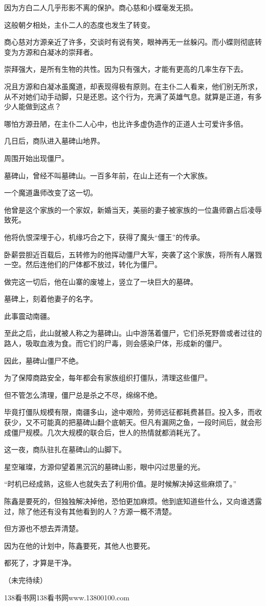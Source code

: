 \begin{this_body}
因为方白二人几乎形影不离的保护。商心慈和小蝶毫发无损。

这般朝夕相处，主仆二人的态度也发生了转变。

商心慈对方源亲近了许多，交谈时有说有笑，眼神再无一丝躲闪。而小蝶则彻底转变为方源和白凝冰的崇拜者。

崇拜强大，是所有生物的共性。因为只有强大，才能有更高的几率生存下去。

况且方源和白凝冰虽魔道，却表现得极有原则。在主仆二人看来，他们别无所求，从不对她们动手动脚，只是还恩。这个行为，充满了英雄气息。就算是正道，有多少人能做到这点？

哪怕方源丑陋，在主仆二人心中，也比许多虚伪造作的正道人士可爱许多倍。

几日后，商队进入墓碑山地界。

周围开始出现僵尸。

墓碑山，曾经不叫墓碑山。一百多年前，在山上还有一个大家族。

一个魔道蛊师改变了这一切。

他曾是这个家族的一个家奴，新婚当天，美丽的妻子被家族的一位蛊师霸占后凌辱致死。

他将仇恨深埋于心，机缘巧合之下，获得了魔头“僵王”的传承。

卧薪尝胆近百载后，五转修为的他挥动僵尸大军，突袭了这个家族，将所有人屠戮一空。然后连他们的尸体都不放过，转化为僵尸。

做完这一切后，他在山寨的废墟上，竖立了一块巨大的墓碑。

墓碑上，刻着他妻子的名字。

此事震动南疆。

至此之后，此山就被人称之为墓碑山。山中游荡着僵尸，它们杀死野兽或者过往的路人，吸取血液为食。而它们的尸毒，则会感染尸体，形成新的僵尸。

因此，墓碑山僵尸不绝。

为了保障商路安全，每年都会有家族组织打僵队，清理这些僵尸。

但不管怎么清理，僵尸总是杀之不尽，绵绵不绝。

毕竟打僵队规模有限，南疆多山，途中艰险，劳师远征都耗费甚巨。投入多，而收获少，又不可能真的把墓碑山翻个底朝天。但凡有漏网之鱼，一段时间后，就会形成僵尸规模。几次大规模的联合后，世人的热情就都消耗光了。

这一夜，商队驻扎在墓碑山的山脚下。

星空璀璨，方源仰望着黑沉沉的墓碑山影，眼中闪过思量的光。

“时机已经成熟，这些人也就失去了利用价值。是时候解决掉这些麻烦了。”

陈鑫是要死的，但独独解决掉他，恐怕更加麻烦。他到底知道些什么，又向谁透露过，除了他还有没有其他看到的人？方源一概不清楚。

但方源也不想去弄清楚。

因为在他的计划中，陈鑫要死，其他人也要死。

都死了，才算是干净。

（未完待续）

138看书网138看书网www.13800100.com

\end{this_body}

